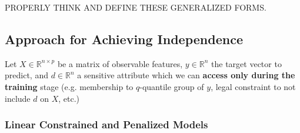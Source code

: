 \documentclass[11pt]{article}
\theoremstyle{plain}
\theoremstyle{definition}
\newcommand{\R}{\mathbb{R}}
\newcommand{\1}{\mathbf{1}}
\renewcommand{\R}{\mathbb{R}}
\begin{document}
{\color{red} PROPERLY THINK AND DEFINE THESE GENERALIZED FORMS.}


\subsection{Approach for Achieving Independence}

Let $X\in \R^{n\times p}$ be a matrix of observable features, $y \in \R^n$ the target vector to predict, and $d \in \R^n$ a sensitive attribute which we can \textbf{access only during the training} stage (e.g. membership to $q$-quantile group of $y$, legal constraint to not include $d$ on $X$, etc.) 

\subsubsection{Linear Constrained and Penalized Models}
\end{document}
